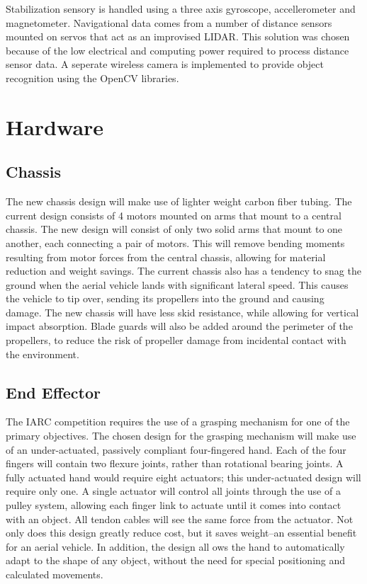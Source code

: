\documentclass[12pt,letterpaper]{article}
\begin{document}
Stabilization sensory is handled using a three axis gyroscope, 
accellerometer and magnetometer. Navigational data comes from a number of
distance sensors mounted on servos that act as an improvised LIDAR. 
This solution was chosen because of the
low electrical and computing power required to process distance sensor data.
A seperate wireless camera is implemented to provide object recognition
using the OpenCV libraries.


\section*{Hardware}

\subsection*{Chassis}

The new chassis design will make use of lighter weight carbon fiber tubing.  The
 current design consists of 4 motors mounted on arms that mount to a central
chassis.  The new design will consist of only two solid arms that mount to one
another, each connecting a pair of motors.  This will remove bending moments
resulting from motor forces from the central chassis, allowing for material
reduction and weight savings.  The current chassis also has a tendency to snag
the ground when the aerial vehicle lands with significant lateral speed.  This
causes the vehicle to tip over, sending its propellers into the ground and
causing damage.  The new chassis will have less skid resistance, while allowing
for vertical impact absorption.  Blade guards will also be added around the
perimeter of the propellers, to reduce the risk of propeller damage from
incidental contact with the environment.


\subsection*{End Effector}

The IARC competition requires the use of a grasping mechanism for one of the
primary objectives.  The chosen design for the grasping mechanism will make use
of an under-actuated, passively compliant four-fingered hand.  Each of the four
fingers will contain two flexure joints, rather than rotational bearing joints.
A fully actuated hand would require eight actuators; this under-actuated design
will require only one.  A single actuator will control all joints through the
use of a pulley system, allowing each finger link to actuate until it comes into
 contact with an object.  All tendon cables will see the same force from the
actuator.  Not only does this design greatly reduce cost, but it saves
weight--an essential benefit for an aerial vehicle.  In addition, the design all
ows the hand to automatically adapt to the shape of any object, without the need
 for special positioning and calculated movements.
\end{document}
